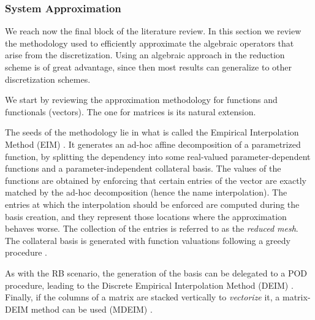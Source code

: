 \subsubsection{System Approximation}
We reach now the final block of the literature review.
In this section we review the methodology used to efficiently approximate 
the algebraic operators that arise from the discretization.
Using an algebraic approach in the reduction scheme is of great advantage,
since then most results can generalize to other discretization schemes.

We start by reviewing the approximation methodology for functions and functionals (vectors).
The one for matrices is its natural extension.

The seeds of the methodology lie in what is called the 
Empirical Interpolation Method (EIM)
\cite{barrault:hal-00021702,
Casenave2014,
Nguyen2008}.
It generates an ad-hoc affine decomposition of a parametrized function,
by splitting the dependency into some real-valued parameter-dependent functions 
and a parameter-independent collateral basis.
The values of the functions are obtained by 
enforcing that certain entries of the vector are 
exactly matched by the ad-hoc decomposition
(hence the name interpolation).
The entries at which the interpolation should be enforced 
are computed during the basis creation,
and they represent those locations where the approximation behaves worse.
The collection of the entries is referred to as the \textit{reduced mesh}.
The collateral basis is generated with function valuations following
a greedy procedure 
\cite{Hesthaven2014}.

As with the RB scenario, 
the generation of the basis can be delegated to a POD procedure,
leading to the Discrete Empirical Interpolation Method (DEIM)
\cite{2010_nonlinearModelReductionDeim_chaturantabut,
2018_podDeimReducedOrderModelDeformingMeshAeroelasticApplications_Donfrancesco}.
Finally, if the columns of a matrix are stacked vertically to \textit{vectorize} it,
a matrix-DEIM method can be used (MDEIM)
\cite{2012_deimAPosterioriNonlinear_DinamicalSystems,
2015_efficientModelReductionParametrizedSystemsMatrixDeim_Negri,
mdeim_elasticity_problems, 
Wirtz2014}.


